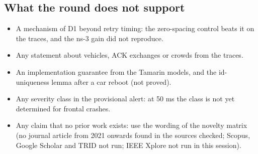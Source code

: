 \subsection*{What the round does not support}

\begin{itemize}
\item A mechanism of D1 beyond retry timing: the zero-spacing control beats it on the traces, and the ns-3 gain did not reproduce.
\item Any statement about vehicles, ACK exchanges or crowds from the traces.
\item An implementation guarantee from the Tamarin models, and the id-uniqueness lemma after a car reboot (not proved).
\item Any severity class in the provisional alert: at 50 ms the class is not yet determined for frontal crashes.
\item Any claim that no prior work exists: use the wording of the novelty matrix (no journal article from 2021 onwards found in the sources checked; Scopus, Google Scholar and TRID not run; IEEE Xplore not run in this session).
\end{itemize}
